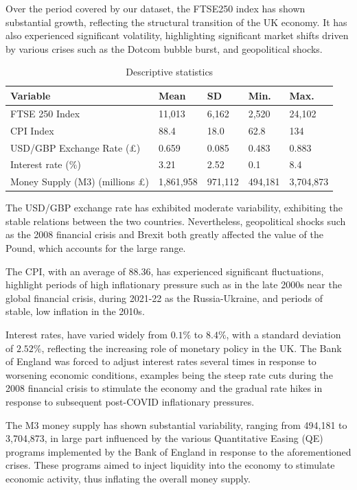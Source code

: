 \documentclass[11pt,a4paper]{article}
\begin{document}
Over the period covered by our dataset, the FTSE250 index has 
shown substantial growth, reflecting the structural transition of the UK economy.
It has also experienced significant volatility, highlighting significant market shifts driven by 
various crises such as the Dotcom bubble burst, and geopolitical shocks.

\begin{table}[h!]
    \centering
    \caption{Descriptive statistics}
    \begin{tabular}{lllll}
        \toprule
        \textbf{Variable} & \textbf{Mean} & \textbf{SD} &  \textbf{Min.} & \textbf{Max.}\\
        \midrule
        FTSE 250 Index &  11,013 & 6,162 & 2,520 & 24,102 \\
        CPI Index &  88.4 & 18.0 & 62.8 & 134 \\
        USD/GBP Exchange Rate (£) &  0.659 & 0.085 & 0.483 & 0.883 \\
        Interest rate ($\%$) &  3.21 & 2.52 & 0.1 & 8.4 \\
        Money Supply (M3) (millions £) &  1,861,958 & 971,112 & 494,181 & 3,704,873 \\
        \bottomrule
    \end{tabular}
\end{table}


The USD/GBP exchange rate has exhibited moderate variability, exhibiting the stable relations between 
the two countries. Nevertheless, geopolitical shocks such as the 2008 financial crisis and Brexit both greatly affected the value of the Pound, 
which accounts for the large range. 

The CPI, with an average of 88.36, has 
experienced significant fluctuations, highlight periods of high inflationary pressure such as in the late 2000s 
near the global financial crisis, during 2021-22 as the Russia-Ukraine, and periods of stable, low
inflation in the 2010s.

Interest rates, have varied widely from $0.1\%$ to $8.4\%$, with a standard deviation of $2.52\%$, reflecting the 
increasing role of monetary policy in the UK. The Bank of England was forced to adjust interest rates 
several times in response to worsening economic conditions, examples being the steep rate cuts during the 2008 financial crisis to stimulate the economy and the gradual rate hikes in response to 
subsequent post-COVID inflationary pressures. 

The M3 money supply has shown substantial variability, ranging from 494,181 to 3,704,873, 
in large part influenced by the various Quantitative Easing (QE) programs implemented by the Bank of England 
in response to the aforementioned crises. These programs aimed to inject liquidity into the economy to stimulate economic activity, thus inflating the overall money supply.
\end{document}
